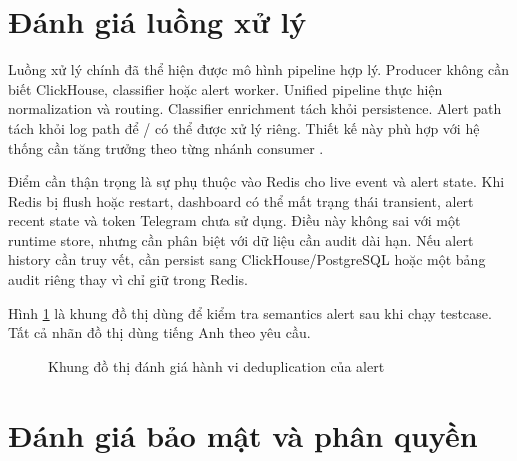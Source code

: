 \section{Đánh giá luồng xử lý}

Luồng xử lý chính đã thể hiện được mô hình pipeline hợp lý. Producer không cần biết ClickHouse, classifier hoặc alert worker. Unified pipeline thực hiện normalization và routing. Classifier enrichment tách khỏi persistence. Alert path tách khỏi log path để / có thể được xử lý riêng. Thiết kế này phù hợp với hệ thống cần tăng trưởng theo từng nhánh consumer \cite{newman2015,richardson2018}.

Điểm cần thận trọng là sự phụ thuộc vào Redis cho live event và alert state. Khi Redis bị flush hoặc restart, dashboard có thể mất trạng thái transient, alert recent state và token Telegram chưa sử dụng. Điều này không sai với một runtime store, nhưng cần phân biệt với dữ liệu cần audit dài hạn. Nếu alert history cần truy vết, cần persist sang ClickHouse/PostgreSQL hoặc một bảng audit riêng thay vì chỉ giữ trong Redis.

Hình \ref{fig:graph-alerts} là khung đồ thị dùng để kiểm tra semantics alert sau khi chạy testcase. Tất cả nhãn đồ thị dùng tiếng Anh theo yêu cầu.


\begin{figure}[H]
\centering
{}
\caption{Khung đồ thị đánh giá hành vi deduplication của alert}
\label{fig:graph-alerts}
\end{figure}


\section{Đánh giá bảo mật và phân quyền}

